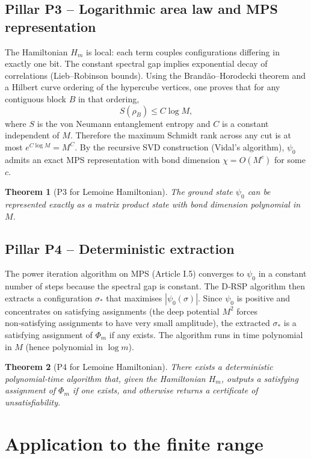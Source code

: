\documentclass[11pt,a4paper]{article}
\newtheorem{theorem}{Theorem}[section]
\begin{document}
\subsection{Pillar P3 – Logarithmic area law and MPS representation}

The Hamiltonian \(H_m\) is local: each term couples configurations differing in exactly one bit. The constant spectral gap implies exponential decay of correlations (Lieb–Robinson bounds). Using the Brandão–Horodecki theorem and a Hilbert curve ordering of the hypercube vertices, one proves that for any contiguous block \(B\) in that ordering,
\[
S(\rho_B) \le C \log M,
\]
where \(S\) is the von Neumann entanglement entropy and \(C\) is a constant independent of \(M\). Therefore the maximum Schmidt rank across any cut is at most \(e^{C\log M} = M^{C}\). By the recursive SVD construction (Vidal's algorithm), \(\psi_0\) admits an exact MPS representation with bond dimension \(\chi = O(M^{c})\) for some \(c\).

\begin{theorem}[P3 for Lemoine Hamiltonian]
The ground state \(\psi_0\) can be represented exactly as a matrix product state with bond dimension polynomial in \(M\).
\end{theorem}

\subsection{Pillar P4 – Deterministic extraction}

The power iteration algorithm on MPS (Article I.5) converges to \(\psi_0\) in a constant number of steps because the spectral gap is constant. The D‑RSP algorithm then extracts a configuration \(\sigma_{*}\) that maximises \(|\psi_0(\sigma)|\). Since \(\psi_0\) is positive and concentrates on satisfying assignments (the deep potential \(M^2\) forces non‑satisfying assignments to have very small amplitude), the extracted \(\sigma_{*}\) is a satisfying assignment of \(\Phi_m\) if any exists. The algorithm runs in time polynomial in \(M\) (hence polynomial in \(\log m\)).

\begin{theorem}[P4 for Lemoine Hamiltonian]
There exists a deterministic polynomial‑time algorithm that, given the Hamiltonian \(H_m\), outputs a satisfying assignment of \(\Phi_m\) if one exists, and otherwise returns a certificate of unsatisfiability.
\end{theorem}

\section{Application to the finite range}
\end{document}
